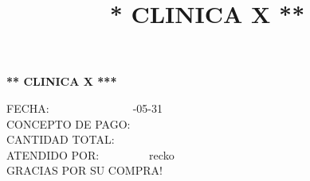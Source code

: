 \documentclass[10pt,a4paper]{letter}
\title{\bf ** CLINICA X **}
\begin{document}
\begin{center}
{\scshape\LARGE \bf *** CLINICA X ***\par}

\end{center}

FECHA:\ \ \ \ \ \ \ \ \ \ \ \ \ \ \ -05-31 \\
CONCEPTO DE PAGO:\ \  \ \ \ \ \ \ \ \consulta \\
CANTIDAD TOTAL:\ \ \ \ \ \ \ \ \  \\
ATENDIDO POR:\ \ \ \ \ \ \ \ \ \Bryan recko \\
GRACIAS POR SU COMPRA! \\ \\

 
\end{document}
